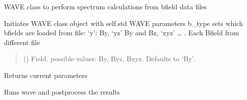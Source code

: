 \documentclass[letterpaper,10pt,english]{sphinxmanual}
\begin{document}
\begin{fulllineitems}
\label{\detokenize{API:wavepy.wave.WaveFromB}}
\pysigstartsignatures
{}
\pysigstopsignatures
\sphinxAtStartPar
WAVE class to perform spectrum calculations from b\sphinxhyphen{}field data files

\sphinxAtStartPar
Initiates WAVE class object with self.std WAVE parameters
b\_type sets which b\sphinxhyphen{}fields are loaded from file: ‘y’: By,
‘yz’ By and Bz, ‘xyz’ … . Each B\sphinxhyphen{}field from different file
\begin{quote}\begin{description}
\sphinxAtStartPar
{} (\sphinxstyleliteralemphasis{\sphinxupquote{, }}) \textendash{} Field. possible values: By, Byz, Bxyz. Defaults to ‘By’.

\end{description}\end{quote}

\begin{fulllineitems}
\label{\detokenize{API:wavepy.wave.WaveFromB.get_paras}}
\pysigstartsignatures
{}
\pysigstopsignatures
\sphinxAtStartPar
Returns current parameters

\end{fulllineitems}


\begin{fulllineitems}
\label{\detokenize{API:wavepy.wave.WaveFromB.run_wave}}
\pysigstartsignatures
{}
\pysigstopsignatures
\sphinxAtStartPar
Runs wave and postprocess the results

\end{fulllineitems}



\end{fulllineitems}
\end{document}
